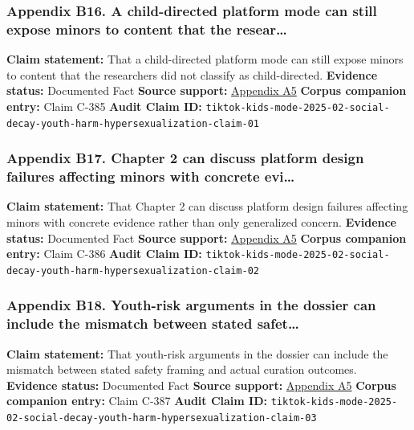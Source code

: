 \documentclass[
  american,
  11pt,
  letterpaper,
]{article}
\begin{document}
\subsubsection{Appendix B16. A child-directed platform mode can still
expose minors to content that the
resear\ldots{}}\label{appendix-b16-a-child-directed-platform-mode-can-still-expose-minors-to-content-that-the-resear}

\textbf{Claim statement:} That a child-directed platform mode can still
expose minors to content that the researchers did not classify as
child-directed. \textbf{Evidence status:} Documented Fact \textbf{Source
support:}
\hyperref[appendix-a5-when-kids-mode-isn-t-for-kids-investigating-tiktok-s-under-13-experience]{Appendix
A5} \textbf{Corpus companion entry:} Claim C-385 \textbf{Audit Claim
ID:}
\texttt{tiktok-kids-mode-2025-02-social-decay-youth-harm-hypersexualization-claim-01}

\subsubsection{Appendix B17. Chapter 2 can discuss platform design
failures affecting minors with concrete
evi\ldots{}}\label{appendix-b17-chapter-2-can-discuss-platform-design-failures-affecting-minors-with-concrete-evi}

\textbf{Claim statement:} That Chapter 2 can discuss platform design
failures affecting minors with concrete evidence rather than only
generalized concern. \textbf{Evidence status:} Documented Fact
\textbf{Source support:}
\hyperref[appendix-a5-when-kids-mode-isn-t-for-kids-investigating-tiktok-s-under-13-experience]{Appendix
A5} \textbf{Corpus companion entry:} Claim C-386 \textbf{Audit Claim
ID:}
\texttt{tiktok-kids-mode-2025-02-social-decay-youth-harm-hypersexualization-claim-02}

\subsubsection{Appendix B18. Youth-risk arguments in the dossier can
include the mismatch between stated
safet\ldots{}}\label{appendix-b18-youth-risk-arguments-in-the-dossier-can-include-the-mismatch-between-stated-safet}

\textbf{Claim statement:} That youth-risk arguments in the dossier can
include the mismatch between stated safety framing and actual curation
outcomes. \textbf{Evidence status:} Documented Fact \textbf{Source
support:}
\hyperref[appendix-a5-when-kids-mode-isn-t-for-kids-investigating-tiktok-s-under-13-experience]{Appendix
A5} \textbf{Corpus companion entry:} Claim C-387 \textbf{Audit Claim
ID:}
\texttt{tiktok-kids-mode-2025-02-social-decay-youth-harm-hypersexualization-claim-03}
\end{document}

